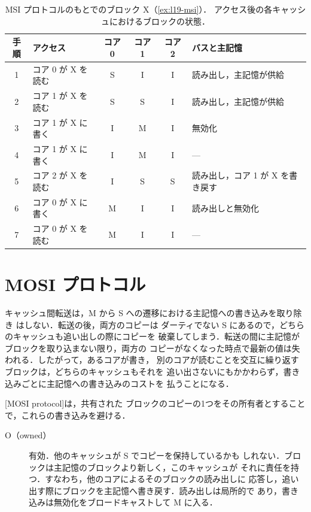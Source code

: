 \documentclass[../main.tex]{subfiles}
\begin{document}
\begin{table}[htbp]
  \centering\small
  \caption{MSI プロトコルのもとでのブロック X（\cref{ex:l19-msi}）．
    アクセス後の各キャッシュにおけるブロックの状態．}
  \label{tab:l19-msi}
  \setlength{\tabcolsep}{4pt}
  \begin{tabular}{@{}cl ccc l@{}}
    \toprule
    手順 & アクセス & コア 0 & コア 1 & コア 2 & バスと主記憶 \\
    \midrule
    1 & コア 0 が X を読む  & S & I & I & 読み出し，主記憶が供給 \\
    2 & コア 1 が X を読む  & S & S & I & 読み出し，主記憶が供給 \\
    3 & コア 1 が X に書く & I & M & I & 無効化 \\
    4 & コア 1 が X に書く & I & M & I & --- \\
    5 & コア 2 が X を読む  & I & S & S & 読み出し，コア 1 が X を書き戻す \\
    6 & コア 0 が X に書く & M & I & I & 読み出しと無効化 \\
    7 & コア 0 が X を読む  & M & I & I & --- \\
    \bottomrule
  \end{tabular}
\end{table}

\section{MOSI プロトコル}
\label{sec:l19-mosi}

キャッシュ間転送は，M から S への遷移における主記憶への書き込みを取り除き
はしない．転送の後，両方のコピーは
ダーティでない S にあるので，どちらのキャッシュも追い出しの際にコピーを
破棄してしまう．転送の間に主記憶がブロックを取り込まない限り，両方の
コピーがなくなった時点で最新の値は失われる．したがって，あるコアが書き，
別のコアが読むことを交互に繰り返すブロックは，どちらのキャッシュもそれを
追い出さないにもかかわらず，書き込みごとに主記憶への書き込みのコストを
払うことになる．

[MOSI protocol]は，共有された
ブロックのコピーの1つをその所有者とすることで，これらの書き込みを避ける．
\begin{description}
  \item[O（owned）] 有効．他のキャッシュが S でコピーを保持しているかも
    しれない．ブロックは主記憶のブロックより新しく，このキャッシュが
    それに責任を持つ．すなわち，他のコアによるそのブロックの読み出しに
    応答し，追い出す際にブロックを主記憶へ書き戻す．読み出しは局所的で
    あり，書き込みは無効化をブロードキャストして M に入る．
\end{description}
\end{document}
